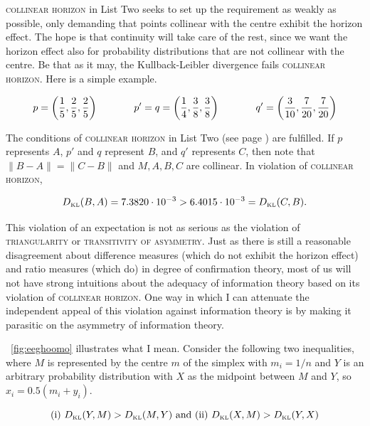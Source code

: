 \documentclass[phd,12pt,oneside]{ubcthesis}
\begin{document}
\textsc{collinear horizon} in List Two seeks to set up the requirement
as weakly as possible, only demanding that points collinear with the
centre exhibit the horizon effect. The hope is that continuity will
take care of the rest, since we want the horizon effect also for
probability distributions that are not collinear with the centre. Be
that as it may, the Kullback-Leibler divergence fails
\textsc{collinear horizon}. Here is a simple example.

\begin{equation}
  \label{eq:ubiesohx}
    p=\left(\frac{1}{5},\frac{2}{5},\frac{2}{5}\right) \hspace{.5in}
    p'=q=\left(\frac{1}{4},\frac{3}{8},\frac{3}{8}\right)  \hspace{.5in}
    q'=\left(\frac{3}{10},\frac{7}{20},\frac{7}{20}\right)
\end{equation}

{\noindent}The conditions of \textsc{collinear horizon} in List Two (see page
\pageref{page:listtwo}) are fulfilled. If $p$ represents $A$, $p'$ and
$q$ represent $B$, and $q'$ represents $C$, then note that
$\|B-A\|=\|C-B\|$ and $M,A,B,C$ are collinear. In violation of
\textsc{collinear horizon},

\begin{equation}
  \label{eq:eiloothu}
  D_{\mbox{\tiny KL}}(B,A)=7.3820\cdot{}10^{-3}>6.4015\cdot{}10^{-3}=D_{\mbox{\tiny KL}}(C,B).
\end{equation}

This violation of an expectation is not as serious as the violation of
\textsc{triangularity} or \textsc{transitivity of asymmetry}. Just as
there is still a reasonable disagreement about difference measures
(which do not exhibit the horizon effect) and ratio measures (which
do) in degree of confirmation theory, most of us will not have strong
intuitions about the adequacy of information theory based on its
violation of \textsc{collinear horizon}. One way in which I can
attenuate the independent appeal of this violation against information
theory is by making it parasitic on the asymmetry of information
theory.

{\Igure}~\ref{fig:eeghoomo} illustrates what I mean. Consider the
following two inequalities, where $M$ is represented by the centre
$m$ of the simplex with $m_{i}=1/n$ and $Y$ is an arbitrary
probability distribution with $X$ as the midpoint between $M$ and $Y$,
so $x_{i}=0.5(m_{i}+y_{i})$.

\begin{equation}
  \label{eq:dailoosu}
  \mbox{(i) }D_{\mbox{\tiny KL}}(Y,M)>D_{\mbox{\tiny KL}}(M,Y)\mbox{ and (ii) }D_{\mbox{\tiny KL}}(X,M)>D_{\mbox{\tiny KL}}(Y,X)
\end{equation}
\end{document}
